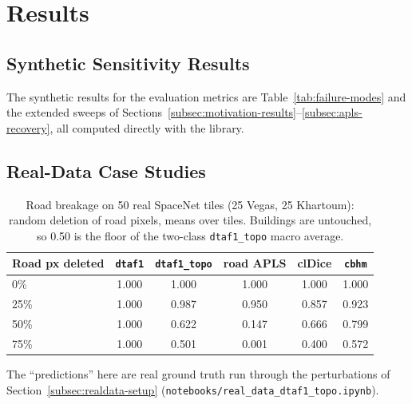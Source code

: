 \section{Results}
\label{sec:results}

\subsection{Synthetic Sensitivity Results}
\label{subsec:synthetic-results}

The synthetic results for the evaluation metrics are Table~\ref{tab:failure-modes} and the
extended sweeps of Sections~\ref{subsec:motivation-results}--\ref{subsec:apls-recovery}, all
computed directly with the library.

\subsection{Real-Data Case Studies}
\label{subsec:realdata-results}

\begin{table}
  \caption{Road breakage on 50 real SpaceNet tiles (25 Vegas, 25 Khartoum): random deletion of
  road pixels, means over tiles. Buildings are untouched, so 0.50 is the floor of the two-class
  \texttt{dtaf1\_topo} macro average.}
  \label{tab:realdata-breakage}
  \small
  \begin{tabular}{@{}lccccc@{}}
    \toprule
    Road px deleted & \texttt{dtaf1} & \texttt{dtaf1\_topo} & road APLS & clDice & \texttt{cbhm} \\
    \midrule
    0\%  & 1.000 & 1.000 & 1.000 & 1.000 & 1.000 \\
    25\% & 1.000 & 0.987 & 0.950 & 0.857 & 0.923 \\
    50\% & 1.000 & 0.622 & 0.147 & 0.666 & 0.799 \\
    75\% & 1.000 & 0.501 & 0.001 & 0.400 & 0.572 \\
    \bottomrule
  \end{tabular}
\end{table}

The ``predictions'' here are real ground truth run through the perturbations of
Section~\ref{subsec:realdata-setup} (\texttt{notebooks/real\_data\_dtaf1\_topo.ipynb}).

